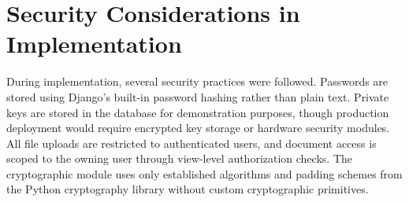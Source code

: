\section{Security Considerations in Implementation}

During implementation, several security practices were followed. Passwords are stored using Django's built-in password hashing rather than plain text. Private keys are stored in the database for demonstration purposes, though production deployment would require encrypted key storage or hardware security modules. All file uploads are restricted to authenticated users, and document access is scoped to the owning user through view-level authorization checks. The cryptographic module uses only established algorithms and padding schemes from the Python cryptography library without custom cryptographic primitives.
